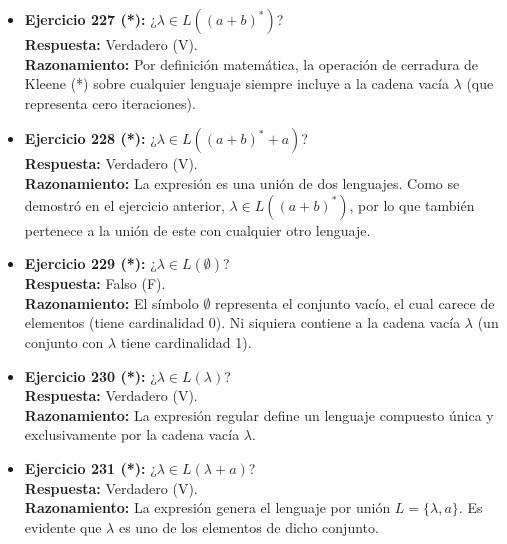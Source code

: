 \documentclass[12pt]{article}
\begin{document}
\begin{itemize}
    \vspace{0.2cm}
    \item \textbf{Ejercicio 227 (*):} ¿$\lambda \in L((a+b)^*)$? \\
    \textbf{Respuesta:} Verdadero (V). \\
    \textbf{Razonamiento:} Por definición matemática, la operación de cerradura de Kleene (*) sobre cualquier lenguaje siempre incluye a la cadena vacía $\lambda$ (que representa cero iteraciones).
    
    \vspace{0.2cm}
    \item \textbf{Ejercicio 228 (*):} ¿$\lambda \in L((a+b)^*+a)$? \\
    \textbf{Respuesta:} Verdadero (V). \\
    \textbf{Razonamiento:} La expresión es una unión de dos lenguajes. Como se demostró en el ejercicio anterior, $\lambda \in L((a+b)^*)$, por lo que también pertenece a la unión de este con cualquier otro lenguaje.
    
    \vspace{0.2cm}
    \item \textbf{Ejercicio 229 (*):} ¿$\lambda \in L(\emptyset)$? \\
    \textbf{Respuesta:} Falso (F). \\
    \textbf{Razonamiento:} El símbolo $\emptyset$ representa el conjunto vacío, el cual carece de elementos (tiene cardinalidad 0). Ni siquiera contiene a la cadena vacía $\lambda$ (un conjunto con $\lambda$ tiene cardinalidad 1).
    
    \vspace{0.2cm}
    \item \textbf{Ejercicio 230 (*):} ¿$\lambda \in L(\lambda)$? \\
    \textbf{Respuesta:} Verdadero (V). \\
    \textbf{Razonamiento:} La expresión regular define un lenguaje compuesto única y exclusivamente por la cadena vacía $\lambda$.
    
    \vspace{0.2cm}
    \item \textbf{Ejercicio 231 (*):} ¿$\lambda \in L(\lambda+a)$? \\
    \textbf{Respuesta:} Verdadero (V). \\
    \textbf{Razonamiento:} La expresión genera el lenguaje por unión $L = \{\lambda, a\}$. Es evidente que $\lambda$ es uno de los elementos de dicho conjunto.
    

\end{itemize}
\end{document}
